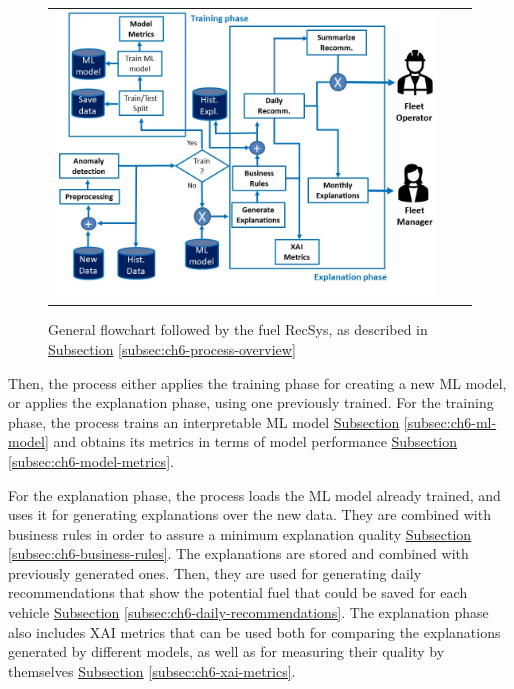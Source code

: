 \begin{figure}
\centering
  \begin{tabular}{c@{\qquad}c@{\qquad}c}
  \includegraphics[width=320pt]{figures/chapter6_LucaFleet/FlowchartFinal.jpg}
  \end{tabular} 
  \caption{General flowchart followed by the fuel RecSys, as described in \hyperref[subsec:ch6-process-overview]{Subsection} \ref{subsec:ch6-process-overview}}
  \label{fig:ch6-flowchart-fuel-recsys}
\end{figure}

Then, the process either applies the training phase for creating a new ML model, or applies the explanation phase, using one previously trained. 
For the training phase, the process trains an interpretable ML model \hyperref[subsec:ch6-ml-model]{Subsection} \ref{subsec:ch6-ml-model} and obtains its metrics in terms of model performance \hyperref[subsec:ch6-model-metrics]{Subsection} \ref{subsec:ch6-model-metrics}.

For the explanation phase, the process loads the ML model already trained, and uses it for generating explanations over the new data. They are combined with business rules in order to assure a minimum explanation quality \hyperref[subsec:ch6-business-rules]{Subsection} \ref{subsec:ch6-business-rules}. The explanations are stored and combined with previously generated ones. Then, they are used for generating daily recommendations that show the potential fuel that could be saved for each vehicle \hyperref[subsec:ch6-daily-recommendations]{Subsection} \ref{subsec:ch6-daily-recommendations}. The explanation phase also includes XAI metrics that can be used both for comparing the explanations generated by different models, as well as for measuring their quality by themselves \hyperref[subsec:ch6-xai-metrics]{Subsection} \ref{subsec:ch6-xai-metrics}.

